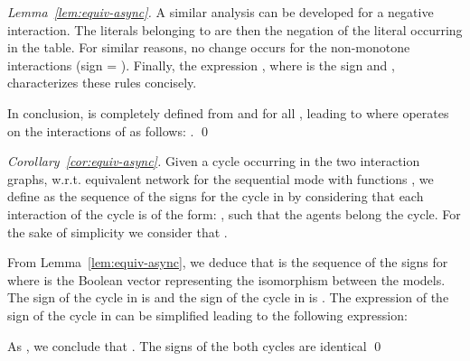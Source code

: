 \documentclass[12pt]{elsarticle}
\newcommand{\wrt}[0]{w.r.t. }
\begin{document}
\begin{proof}[Lemma~\ref{lem:equiv-async}]
\medskip
A similar analysis can be developed for a negative interaction. The literals belonging to  are then the negation of the literal occurring in the table. For similar reasons, no change occurs for the non-monotone interactions (sign = ).
Finally, the expression , where  is the sign and , characterizes these rules concisely. 

In conclusion, 
 is completely defined from  and  for all , leading to  where  operates on the interactions of  as follows: .
\qed \end{proof}

\begin{proof}[Corollary~\ref{cor:equiv-async}]
Given a cycle occurring in the two interaction graphs,  \wrt equivalent network for the sequential mode with functions , we define  as the sequence of the signs for the cycle in  by considering that each interaction of the cycle is of the form: , such that the agents  belong the cycle. For the sake of simplicity we consider that .

\medskip
\noindent
From Lemma~\ref{lem:equiv-async}, we deduce that  is the sequence of the signs for  where  is the Boolean vector representing the isomorphism between the models. The sign of the cycle in  is  and the sign of the cycle in  is . The expression of the sign of the cycle in  can be simplified leading to the following expression:
 
As , we conclude that . The signs of the both cycles are identical \qed 
\end{proof}
\end{document}

